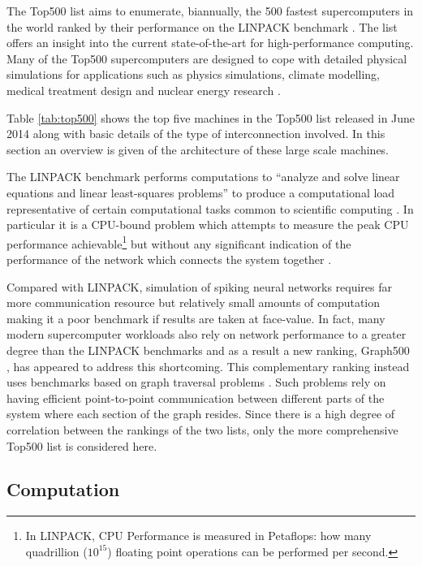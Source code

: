 		The Top500 list \cite{meuer14j} aims to enumerate, biannually, the 500
		fastest supercomputers in the world ranked by their performance on the
		LINPACK benchmark \cite{dongarraLINPAC}. The list offers an insight into the
		current state-of-the-art for high-performance computing. Many of the Top500
		supercomputers are designed to cope with detailed physical simulations for
		applications such as physics simulations, climate modelling, medical
		treatment design and nuclear energy research
		\cite{olcf12,nassif,dongarra13}.
		
		Table \ref{tab:top500} shows the top five machines in the Top500 list
		released in June 2014 along with basic details of the type of
		interconnection involved.  In this section an overview is given of the
		architecture of these large scale machines.
		
		The LINPACK benchmark performs computations to ``analyze and solve linear
		equations and linear least-squares problems'' to produce a computational
		load representative of certain computational tasks common to scientific
		computing \cite{dongarra84}. In particular it is a CPU-bound problem which
		attempts to measure the peak CPU performance achievable\footnote{In LINPACK,
		CPU Performance is measured in Petaflops: how many quadrillion ($10^{15}$)
		floating point operations can be performed per second.} but without any
		significant indication of the performance of the network which connects the
		system together \cite{dongarra07}.
		
		Compared with LINPACK, simulation of spiking neural networks requires far
		more communication resource but relatively small amounts of computation
		making it a poor benchmark if results are taken at face-value. In fact, many
		modern supercomputer workloads also rely on network performance to a greater
		degree than the LINPACK benchmarks and as a result a new ranking, Graph500
		\cite{murphy13n}, has appeared to address this shortcoming. This
		complementary ranking instead uses benchmarks based on graph traversal
		problems \cite{murphy10}. Such problems rely on having efficient
		point-to-point communication between different parts of the system where
		each section of the graph resides. Since there is a high degree of
		correlation between the rankings of the two lists, only the more
		comprehensive Top500 list is considered here.
		
		
		\subsection{Computation}
			
